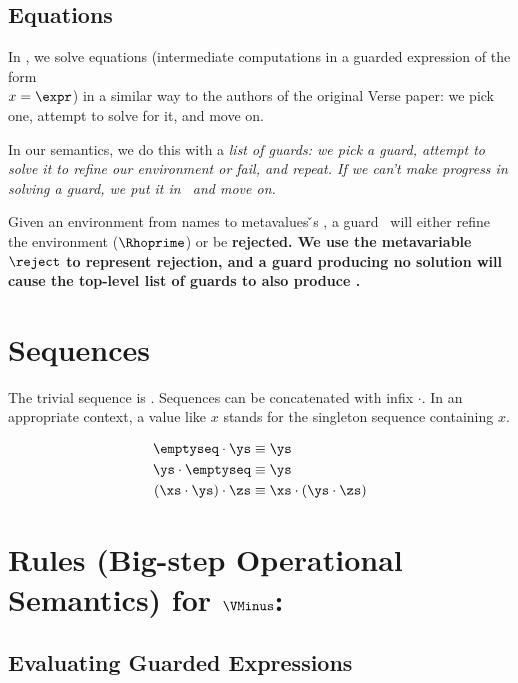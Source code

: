 \documentclass[]{article}
\begin{document}
    \bigskip
\subsection{Equations}

In {\VMinus}, we solve equations (intermediate computations in a guarded
expression of the form \\$x = \expr$) in a similar way to the authors of the
original Verse paper: we pick one, attempt to solve for it, and move on. 

In our semantics, we do this with a \it{list} of guards: we pick a guard, 
attempt to solve it to refine our environment or fail, and repeat. If we 
can't make progress in solving a guard, we put it in \context\ and move on.


Given an environment from names to metavalues {\v}s \Rho, a guard \g\ will
either refine the environment ($\Rhoprime$) or be \bf{rejected}. We use the
metavariable $\reject$ to represent rejection, and a guard producing no
solution will cause the top-level list of guards to also produce \reject. 

    \gfail
    
    \section{Sequences}
    
    The trivial sequence is \emptyseq. Sequences can be concatenated with infix 
$\cdot$. In an appropriate context, a value like $x$ stands for 
the singleton sequence containing $x$. 

\begin{align*}
    \emptyseq \cdot \ys &\equiv \ys \\
    \ys \cdot \emptyseq &\equiv \ys \\
    (\xs \cdot \ys) \cdot \zs &\equiv \xs \cdot (\ys \cdot \zs)
\end{align*}

\section{Rules (Big-step Operational Semantics) for ${\VMinus}$:}
    
\subsection{Evaluating Guarded Expressions}
\end{document}
